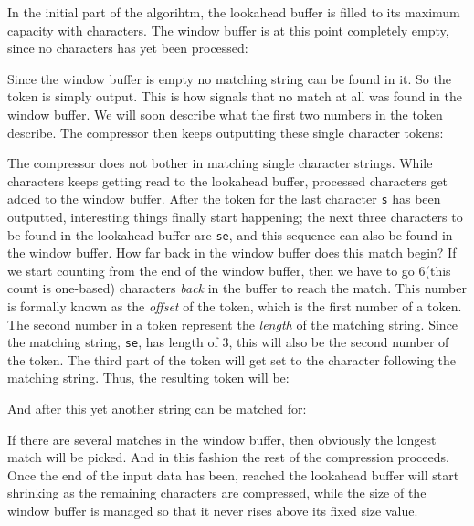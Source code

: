 In the initial part of the algorihtm, the lookahead buffer is filled
to its maximum capacity with characters. The window buffer is at this
point completely empty, since no characters has yet been processed:

\newcommand{\windowsize}{20}
\newcommand{\lookaheadsize}{10}


Since the window buffer is empty no matching string can be found in
it. So the token  is simply output. This is how \lzone
signals that no match at all was found in the window buffer. We will
soon describe what the first two numbers in the token describe. The
compressor then keeps outputting these single character tokens:


The \lzone compressor does not bother in matching single character
strings. While characters keeps getting read to the lookahead buffer,
processed characters get added to the window buffer. After the token
for the last character \texttt{s} has been outputted, interesting
things finally start happening; the next three characters to be found
in the lookahead buffer are \texttt{{\spc{}se}}, and this sequence can
also be found in the window buffer. How far back in the window buffer
does this match begin? If we start counting from the end of the window
buffer, then we have to go $6$(this count is one-based) characters
\textit{back} in the buffer to reach the match. This number is
formally known as the \textit{offset} of the token, which is the first
number of a token. The second number in a token represent the
\textit{length} of the matching string. Since the matching string,
\texttt{{\spc{}se}}, has length of $3$, this will also be the second
number of the token. The third part of the token will get set to the
character following the matching string. Thus, the resulting token
will be:


And after this yet another string can be matched for:


If there are several matches in the window buffer, then obviously the
longest match will be picked. And in this fashion the rest of the
compression proceeds. Once the end of the input data has been, reached
the lookahead buffer will start shrinking as the remaining characters
are compressed, while the size of the window buffer is managed so that
it never rises above its fixed size value.

